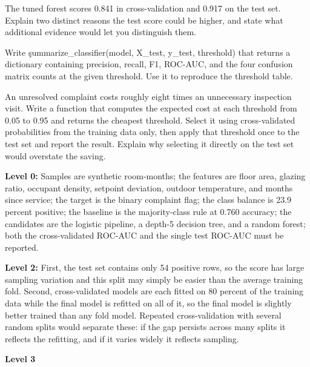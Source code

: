 
The tuned forest scores 0.841 in cross-validation and 0.917 on the test set.
Explain two distinct reasons the test score could be higher, and state what
additional evidence would let you distinguish them.


Write \c{summarize_classifier(model, X_test, y_test, threshold)} that returns a
dictionary containing precision, recall, F1, ROC-AUC, and the four confusion
matrix counts at the given threshold. Use it to reproduce the threshold table.


An unresolved complaint costs roughly eight times an unnecessary inspection
visit. Write a function that computes the expected cost at each threshold from
0.05 to 0.95 and returns the cheapest threshold. Select it using cross-validated
probabilities from the training data only, then apply that threshold once to the
test set and report the result. Explain why selecting it directly on the test
set would overstate the saving.


\textbf{Level 0:} Samples are synthetic room-months; the features are floor
area, glazing ratio, occupant density, setpoint deviation, outdoor temperature,
and months since service; the target is the binary complaint flag; the class
balance is 23.9 percent positive; the baseline is the majority-class rule at
0.760 accuracy; the candidates are the logistic pipeline, a depth-5 decision
tree, and a random forest; both the cross-validated ROC-AUC and the single test
ROC-AUC must be reported.

\textbf{Level 2:} First, the test set contains only 54 positive rows, so the
score has large sampling variation and this split may simply be easier than the
average training fold. Second, cross-validated models are each fitted on 80
percent of the training data while the final model is refitted on all of it, so
the final model is slightly better trained than any fold model. Repeated
cross-validation with several random splits would separate these: if the gap
persists across many splits it reflects the refitting, and if it varies widely it
reflects sampling.

\textbf{Level 3}

